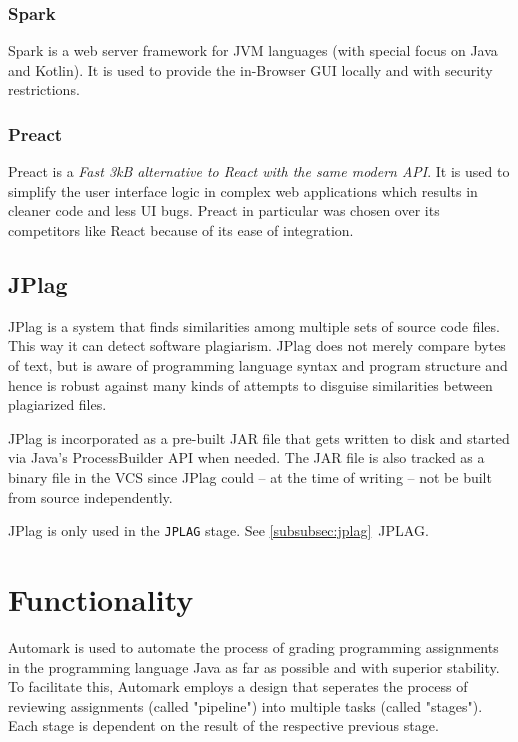 \documentclass[12pt,a4paper,oneside]{report}
\newcommand{\BlockCite}[2]{
	\begin{addmargin}[1cm]{0pt}
		#1

		\fullcite{#2}
	\end{addmargin}
}
\begin{document}
	\subsubsection{Spark}
	Spark is a web server framework for JVM languages (with special focus on Java and Kotlin)\parencite{sparkwebsite}. It is used to provide the in-Browser GUI locally and with security restrictions. %

	\subsubsection{Preact} \label{subsubsec:preact}
	Preact is a \emph{Fast 3kB alternative to React with the same modern API}\parencite{preactwebsite}. It is used to simplify the user interface logic in complex web applications which results in cleaner code and less UI bugs. Preact in particular was chosen over its competitors like React because of its ease of integration.

	\subsection{JPlag} \label{subsec:jplag}
	\BlockCite{JPlag is a system that finds similarities among multiple sets of source code files. This way it can detect software plagiarism. JPlag does not merely compare bytes of text, but is aware of programming language syntax and program structure and hence is robust against many kinds of attempts to disguise similarities between plagiarized files.}{jplagwebsite}

	JPlag is incorporated as a pre-built JAR file that gets written to disk and started via Java's ProcessBuilder API when needed. The JAR file is also tracked as a binary file in the VCS since JPlag could -- at the time of writing -- not be built from source independently.

	JPlag is only used in the \lstinline|JPLAG| stage. See \ref{subsubsec:jplag}~JPLAG.

	\section{Functionality}
	Automark is used to automate the process of grading programming assignments in the programming language Java as far as possible and with superior stability. To facilitate this, Automark employs a design that seperates the process of reviewing assignments (called "pipeline") into multiple tasks (called "stages"). Each stage is dependent on the result of the respective previous stage.
\end{document}
